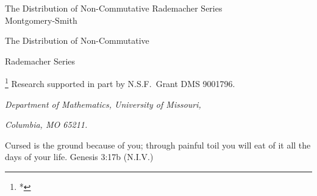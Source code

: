 \def\set#1{\{1$, $2,\ldots,$\ $#1\}}
\def\setzero#1{\{0$, $1,\ldots,$\ $#1\}}
\def\span#1{\overline{\hbox{\rm span}}\{#1\}}

\def\lnorm{\left\|}
\def\rnorm{\right\|}
\def\normo#1{\lnorm #1 \rnorm}
\def\widedot{\,\cdot\,}
\def\normdot{\normo{\widedot}}
\def\trinormo#1{\left|\left|\left| #1 \right|\right|\right|}
\def\trinormdot{\trinormo{\widedot}}

\def\lmod{\left|}
\def\rmod{\right|}
\def\modo#1{\lmod #1 \rmod}

\def\angleo#1{\left\langle #1 \right\rangle}

\def\dom#1{{\vert_{#1}}}

\def\implies{$\Rightarrow$}
\def\iff{$\Leftrightarrow$}

\def\sign{\mathop{\hbox{\rm sign}}}


\def\tr{\mathop{\hbox{\rm tr}}}
\def\d{{\mathchoice{}{}{\hbox{\sevenrm d}}{\hbox{\fiverm d}}}}
\def\ad{{\mathchoice{}{}{\hbox{\sevenrm ad}}{\hbox{\fiverm ad}}}}



\noblankout

\setheadline The Distribution of Non-Commutative Rademacher Series\\
             Montgomery-Smith

{
\seventeenpoint
\centerline{The Distribution of Non-Commutative }
\smallskip
\centerline{Rademacher Series}
}
\bigskip\bigskip\medskip
\centerline{%
\footnote{*}%
{Research supported in part by N.S.F.\ Grant DMS 9001796.}%
}
\smallskip
{
\eightpoint
\centerline{\it Department of Mathematics, University of Missouri,}
\centerline{\it Columbia, MO 65211.}
}
\bigskip\bigskip


\verses
Cursed is the ground because of you;\cr
through painful toil you will eat of it\cr
all the days of your life.\cr
\hfill Genesis 3:17b (N.I.V.)\cr

